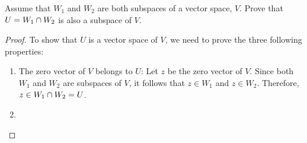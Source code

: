 \begin{question}
    \normalfont

    Assume that $W_1$ and $W_2$ are both subspaces of a vector space, $V$. Prove that $U=W_1\cap W_2$ is also a subspace of $V$.
\end{question}

\renewcommand\qedsymbol{$\blacksquare$}
\begin{proof}
    To show that $U$ is a vector space of $V$, we need to prove the three following properties:
    \begin{enumerate}
        \item The zero vector of $V$ belongs to $U$: Let $z$ be the zero vector of $V$. Since both $W_1$ and $W_2$ are subspaces of $V$, it follows that $z\in W_1$ and $z\in W_2$. Therefore, $z\in W_1\cap W_2=U$.
        \item 
    \end{enumerate}
\end{proof}